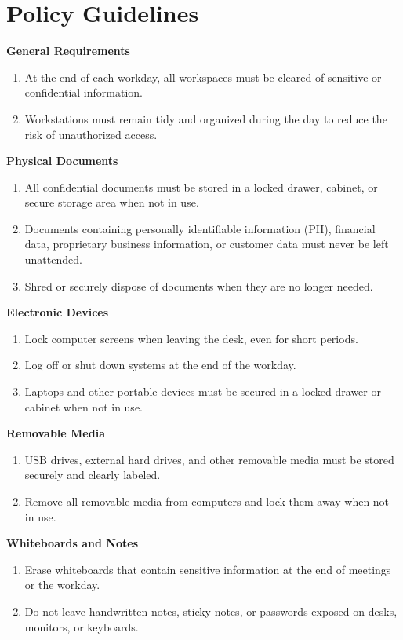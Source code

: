 \section{Policy Guidelines}
\textbf{General Requirements}
\begin{enumerate}
    \item At the end of each workday, all workspaces must be cleared of sensitive or confidential information.
    \item Workstations must remain tidy and organized during the day to reduce the risk of unauthorized access.
\end{enumerate}
\textbf{Physical Documents}
\begin{enumerate}
    \item All confidential documents must be stored in a locked drawer, cabinet, or secure storage area when not in use.
    \item Documents containing personally identifiable information (PII), financial data, proprietary business information, or customer data must never be left unattended.
    \item Shred or securely dispose of documents when they are no longer needed.
\end{enumerate}
\textbf{Electronic Devices}
\begin{enumerate}
    \item Lock computer screens when leaving the desk, even for short periods.
    \item Log off or shut down systems at the end of the workday.
    \item Laptops and other portable devices must be secured in a locked drawer or cabinet when not in use.
\end{enumerate}
\textbf{Removable Media}
\begin{enumerate}
    \item USB drives, external hard drives, and other removable media must be stored securely and clearly labeled.
    \item Remove all removable media from computers and lock them away when not in use.
\end{enumerate}
\textbf{Whiteboards and Notes}
\begin{enumerate}
    \item Erase whiteboards that contain sensitive information at the end of meetings or the workday.
    \item Do not leave handwritten notes, sticky notes, or passwords exposed on desks, monitors, or keyboards.
\end{enumerate}

